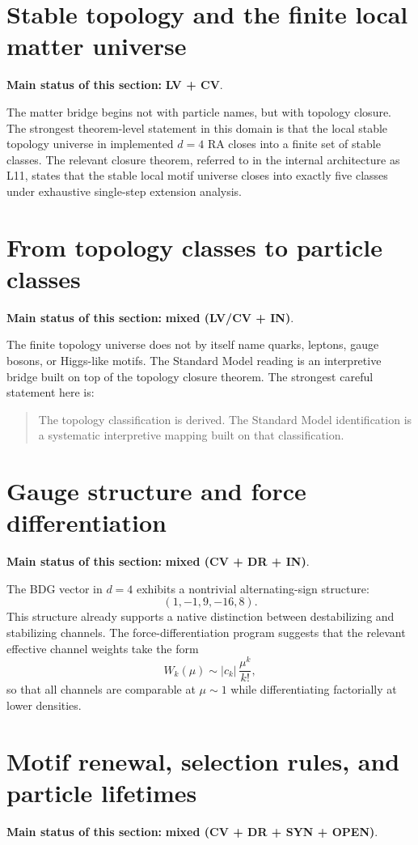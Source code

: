 \documentclass[11pt]{article}
\begin{document}
\section{Stable topology and the finite local matter universe}
\textbf{Main status of this section:} \textbf{LV + CV}.

The matter bridge begins not with particle names, but with topology closure. The strongest theorem-level statement in this domain is that the local stable topology universe in implemented $d=4$ RA closes into a finite set of stable classes. The relevant closure theorem, referred to in the internal architecture as L11, states that the stable local motif universe closes into exactly five classes under exhaustive single-step extension analysis.

\section{From topology classes to particle classes}
\textbf{Main status of this section:} \textbf{mixed (LV/CV + IN)}.

The finite topology universe does not by itself name quarks, leptons, gauge bosons, or Higgs-like motifs. The Standard Model reading is an interpretive bridge built on top of the topology closure theorem. The strongest careful statement here is:
\begin{quote}
The topology classification is derived. The Standard Model identification is a systematic interpretive mapping built on that classification.
\end{quote}

\section{Gauge structure and force differentiation}
\textbf{Main status of this section:} \textbf{mixed (CV + DR + IN)}.

The BDG vector in $d=4$ exhibits a nontrivial alternating-sign structure:
\[
(1,-1,9,-16,8).
\]
This structure already supports a native distinction between destabilizing and stabilizing channels. The force-differentiation program suggests that the relevant effective channel weights take the form
\[
W_k(\mu) \sim |c_k|\,\frac{\mu^k}{k!},
\]
so that all channels are comparable at $\mu\sim 1$ while differentiating factorially at lower densities.

\section{Motif renewal, selection rules, and particle lifetimes}
\textbf{Main status of this section:} \textbf{mixed (CV + DR + SYN + OPEN)}.
\end{document}
